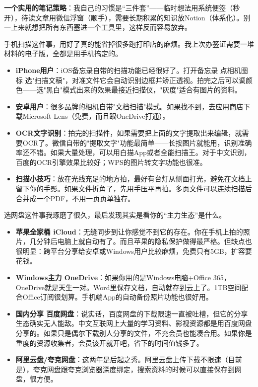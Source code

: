 \textbf{一个实用的笔记策略}：我自己的习惯是“三件套”——临时想法用系统便签（秒开），待读文章用微信浮窗（顺手），需要长期积累的知识放Notion（体系化）。别一上来就想把所有东西塞进一个工具里，这样反而容易放弃。


手机扫描这件事，用好了真的能省掉很多跑打印店的麻烦。我上次办签证需要一堆材料的电子版，全都是用手机搞定的。

\begin{itemize}
  \item \textbf{iPhone用户}：iOS备忘录自带的扫描功能已经很好了。打开备忘录 点相机图标 选"扫描文稿"，对准文件它会自动识别边框并矫正透视。拍完之后可以调颜色——选"黑白"模式出来的效果最接近扫描仪，"灰度"适合有图片的资料。
  \item \textbf{安卓用户}：很多品牌的相机自带"文档扫描"模式。如果找不到，去应用商店下载Microsoft Lens（免费，而且跟OneDrive打通）。
  \item \textbf{OCR文字识别}：拍完的扫描件，如果需要把上面的文字提取出来编辑，就需要OCR了。微信自带的"提取文字"功能最简单——长按图片就能用，识别准确率还不错。如果大量处理，可以用白描App或者全能扫描王。对于中文识别，百度的OCR引擎效果比较好；WPS的图片转文字功能也很准。
  \item \textbf{扫描小技巧}：放在光线充足的地方拍，最好有台灯从侧面打光，避免在文档上留下你的手影。如果文件折角了，先用手压平再拍。多页文件可以连续扫描后合并成一个PDF，不用一页页单独存。
\end{itemize}


选网盘这件事我琢磨了很久，最后发现其实是看你的“主力生态”是什么。

\begin{itemize}
  \item \textbf{苹果全家桶 iCloud}：无缝同步到让你感觉不到它的存在。你在手机上拍的照片，几分钟后电脑上就自动有了。而且苹果的隐私保护做得最严格。但缺点也很明显：跨平台分享给安卓或Windows用户比较麻烦，免费只有5GB，扩容要花钱。
  \item \textbf{Windows主力 OneDrive}：如果你用的是Windows电脑+Office 365，OneDrive就是天生一对。Word里保存文档，自动就存到云上了。1TB空间配合Office订阅很划算。手机端App的自动备份照片功能也很好用。
  \item \textbf{国内分享 百度网盘}：说实话，百度网盘的下载限速一直被吐槽，但它的分享生态确实无人能敌。中文互联网上大量的学习资料、影视资源都是用百度网盘分享的。如果只是偶尔下载别人分享的文件，不充会员也能凑合用。如果你是重度的资源收集者，会员该开就开吧，省下的时间值钱多了。
  \item \textbf{阿里云盘/夸克网盘}：这两年是后起之秀。阿里云盘上传下载不限速（目前是），夸克网盘跟夸克浏览器深度绑定，搜索资料的时候可以直接保存到网盘，很方便。
\end{itemize}

